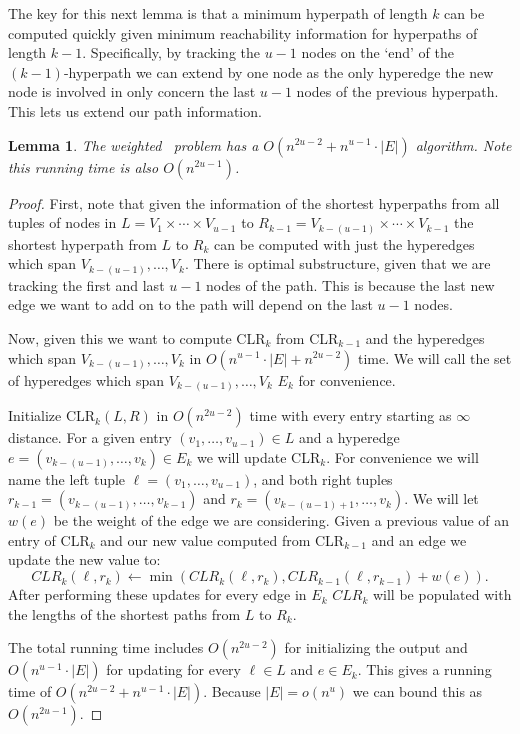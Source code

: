 \documentclass[11pt,letterpaper,pdftex]{article}
\newtheorem{lemma}[theorem]{Lemma}
\begin{document}
The key for this next lemma is that a minimum hyperpath of length $k$ can be computed quickly given minimum reachability information for hyperpaths of length $k-1$. Specifically, by tracking the $u-1$ nodes on the `end' of the $(k-1)$-hyperpath we can extend by one node as the only hyperedge the new node is involved in only concern the last $u-1$ nodes of the previous hyperpath. This lets us extend our path information. 
\begin{lemma}
    The weighted ~problem has a $O(n^{2u-2} + n^{u-1} \cdot |E|)$ algorithm. Note this running time is also $O(n^{2u-1})$.
    
    \label{lem:weightedukECLRAlg}
\end{lemma}
\begin{proof}
    First, note that given the information of the shortest hyperpaths from all tuples of nodes in $L=V_1 \times \cdots \times V_{u-1}$ to $R_{k-1}=V_{k-(u-1)} \times \cdots \times V_{k-1}$ the shortest hyperpath from $L$ to $R_k$ can be computed with just the hyperedges which span $V_{k-(u-1)}, \ldots, V_k$. There is optimal substructure, given that we are tracking the first and last $u-1$ nodes of the path. This is because the last new edge we want to add on to the path will depend on the last $u-1$ nodes. 

    Now, given this we want to compute CLR$_{k}$ from CLR$_{k-1}$ and the hyperedges which span $V_{k-(u-1)}, \ldots, V_k$ in $O(n^{u-1}\cdot|E| + n^{2u-2})$ time. We will call the set of hyperedges which span  $V_{k-(u-1)}, \ldots, V_k$ $E_{k}$ for convenience. 

    Initialize CLR$_{k}(L,R)$ in $O(n^{2u-2})$ time with every entry starting as $\infty$ distance. 
     For a given entry $(v_1,\ldots, v_{u-1}) \in L$ and a hyperedge $e = (v_{k-(u-1)},\ldots,v_{k}) \in E_k$ we will update CLR$_k$. For convenience we will name the left tuple $\ell = (v_1,\ldots, v_{u-1})$, and both right tuples $r_{k-1} = (v_{k-(u-1)},\ldots,v_{k-1})$ and  $r_{k} = (v_{k-(u-1)+1},\ldots,v_{k})$. We will let $w(e)$ be the weight of the edge we are considering. Given a previous value of an entry of CLR$_k$ and our new value computed from CLR$_{k-1}$ and an edge we update the new value to:
     $$CLR_{k}(\ell,r_k) \leftarrow \min \left(CLR_{k}(\ell,r_k), CLR_{k-1}(\ell,r_{k-1}) + w(e) \right).$$
     After performing these updates for every edge in $E_k$  $CLR_{k}$ will be populated with the lengths of the shortest paths from $L$ to $R_k$. 

     The total running time includes $O(n^{2u-2})$ for initializing the output and $O(n^{u-1} \cdot |E|)$ for updating for every $\ell \in L$ and $e \in E_k$. This gives a running time of $O(n^{2u-2} + n^{u-1} \cdot |E|)$. Because $|E| = o(n^u)$ we can bound this as $O(n^{2u-1})$.
\end{proof}
\end{document}
